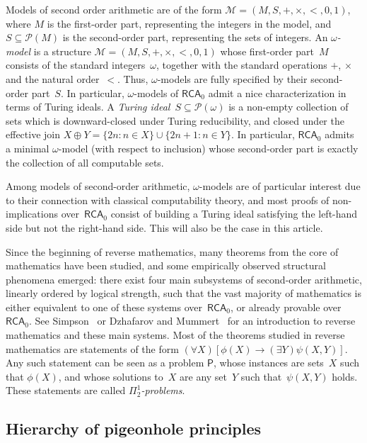 \documentclass{article}
\def\P{\mathcal{P}}
\def\M{\mathcal{M}}
\def\Psf{\mathsf{P}}
\newcommand{\RCA}{\mathsf{RCA}}
\numberwithin{theorem}{section}
\theoremstyle{definition}
\begin{document}
Models of second order arithmetic are of the form $\M = (M, S, +, \times, <, 0, 1)$, where $M$ is the first-order part, representing the integers in the model, and $S \subseteq \P(M)$ is the second-order part, representing the sets of integers. An \emph{$\omega$-model} is a structure $\M = (M, S, +, \times, <, 0, 1)$ whose first-order part~$M$ consists of the standard integers~$\omega$, together with the standard operations $+$, $\times$ and the natural order~$<$. Thus, $\omega$-models are fully specified by their second-order part~$S$. In particular, $\omega$-models of $\RCA_0$ admit a nice characterization in terms of Turing ideals. A \emph{Turing ideal}~$S \subseteq \P(\omega)$ is a non-empty collection of sets which is downward-closed under Turing reducibility, and closed under the effective join $X \oplus Y = \{ 2n : n \in X \} \cup \{ 2n+1 : n \in Y \}$. 
In particular, $\RCA_0$ admits a minimal $\omega$-model (with respect to inclusion) whose second-order part is exactly the collection of all computable sets.

Among models of second-order arithmetic, $\omega$-models are of particular interest due to their connection with classical computability theory, and most proofs of non-implications over~$\RCA_0$ consist of building a Turing ideal satisfying the left-hand side but not the right-hand side. This will also be the case in this article.

Since the beginning of reverse mathematics, many theorems from the core of mathematics have been studied, and some empirically observed structural phenomena emerged: there exist four main subsystems of second-order arithmetic, linearly ordered by logical strength, such that the vast majority of mathematics is either equivalent to one of these systems over~$\RCA_0$, or already provable over~$\RCA_0$. See Simpson~\cite{simpson2009subsystems} or Dzhafarov and Mummert~\cite{dzhafarov2022reverse} for an introduction to reverse mathematics and these main systems. Most of the theorems studied in reverse mathematics are statements of the form $(\forall X)[\phi(X) \rightarrow (\exists Y)\psi(X, Y)]$. Any such statement can be seen as a problem $\Psf$, whose instances are sets~$X$ such that $\phi(X)$, and whose solutions to~$X$ are any set~$Y$ such that~$\psi(X,Y)$ holds. These statements are called \emph{$\Pi^1_2$-problems}.

\subsection{Hierarchy of pigeonhole principles}
\end{document}
